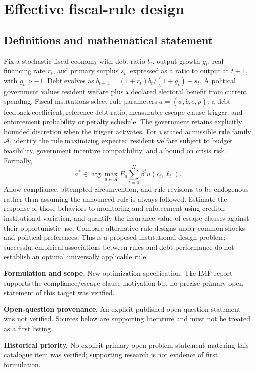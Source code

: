 \documentclass[11pt]{article}
\begin{document}
\section*{Effective fiscal-rule design}\label{30007540}
\subsection{Definitions and mathematical statement}
Fix a stochastic fiscal economy with debt ratio \(b_t\), output growth \(g_t\), real financing rate \(r_t\), and primary surplus \(s_t\), expressed as a ratio to output at \(t+1\), with \(g_t>-1\). Debt evolves as \(b_{t+1}=(1+r_t)b_t/(1+g_t)-s_t\). A political government values resident welfare plus a declared electoral benefit from current spending. Fiscal institutions select rule parameters \(a=(\phi,\bar b,e,p)\): a debt-feedback coefficient, reference debt ratio, measurable escape-clause trigger, and enforcement probability or penalty schedule. The government retains explicitly bounded discretion when the trigger activates.
For a stated admissible rule family \(\mathcal A\), identify the rule maximizing expected resident welfare subject to budget feasibility, government incentive compatibility, and a bound on crisis risk. Formally,
\[
a^*\in\arg\max_{a\in\mathcal A}E_a\sum_{t=0}^{H}\beta^t u(c_t,\ell_t).
\]
Allow compliance, attempted circumvention, and rule revisions to be endogenous rather than assuming the announced rule is always followed. Estimate the response of those behaviors to monitoring and enforcement using credible institutional variation, and quantify the insurance value of escape clauses against their opportunistic use. Compare alternative rule designs under common shocks and political preferences. This is a proposed institutional-design problem; successful empirical associations between rules and debt performance do not establish an optimal universally applicable rule.

\par\textbf{Formulation and scope.} New optimization specification. The IMF report supports the compliance/escape-clause motivation but no precise primary open statement of this target was verified.

\par\textbf{Open-question provenance.} An explicit published open-question statement was not verified. Sources below are supporting literature and must not be treated as a first listing.

\par\textbf{Historical priority.} No explicit primary open-problem statement matching this catalogue item was verified; supporting research is not evidence of first formulation.
\end{document}

